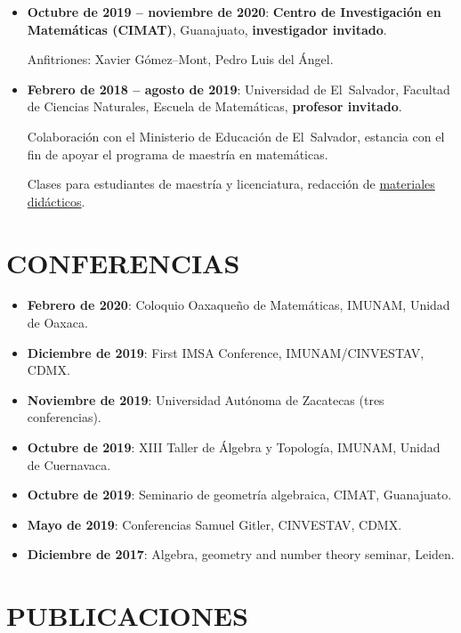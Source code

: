 \documentclass{article}
\begin{document}
\begin{itemize}
\item \textbf{Octubre de 2019 -- noviembre de 2020}:
  \textbf{Centro de Investigación en Matemáticas (CIMAT)},
  Guanajuato, \textbf{investigador invitado}.

  Anfitriones: Xavier Gómez--Mont, Pedro Luis del Ángel.

\item \textbf{Febrero de 2018 -- agosto de 2019}:
  Universidad de El~Salvador,
  Facultad de Ciencias Naturales, Escuela de Matemáticas,
  \textbf{profesor invitado}.

  Colaboración con el Ministerio de Educación de El~Salvador,
  estancia con el fin de apoyar el programa de maestría en matemáticas.

  Clases para estudiantes de maestría y licenciatura, redacción de
  \href{https://cadadr.org/san-salvador/}{materiales didácticos}.
\end{itemize}

{\color{RoyalBlue}\section*{CONFERENCIAS}}

\begin{itemize}
\item \textbf{Febrero de 2020}: Coloquio Oaxaqueño de Matemáticas,
  IMUNAM, Unidad de Oaxaca.

\item \textbf{Diciembre de 2019}: First IMSA Conference,
  IMUNAM/CINVESTAV, CDMX.

\item \textbf{Noviembre de 2019}: Universidad Autónoma de Zacatecas
  (tres conferencias).

\item \textbf{Octubre de 2019}: XIII Taller de Álgebra y Topología,
  IMUNAM, Unidad de Cuernavaca.

\item \textbf{Octubre de 2019}: Seminario de geometría algebraica,
  CIMAT, Guanajuato.

\item \textbf{Mayo de 2019}: Conferencias Samuel Gitler,
  CINVESTAV, CDMX.

\item \textbf{Diciembre de 2017}:
  Algebra, geometry and number theory seminar, Leiden.
\end{itemize}

{\color{RoyalBlue}\section*{PUBLICACIONES}}
\end{document}
